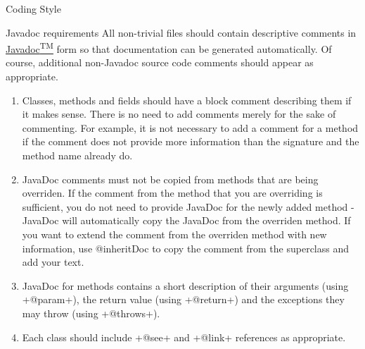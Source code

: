 \begin{section}{Coding Style}
\begin{subsection}{Javadoc requirements}
All non-trivial files should contain descriptive comments in \href{http://www.oracle.com/technetwork/java/javase/documentation/index-jsp-135444.html}{Javadoc\textsuperscript{TM}} form so that documentation can be generated automatically. Of course, additional non-Javadoc source code comments should appear as appropriate.
\begin{enumerate}
  \item Classes, methods and fields should have a block comment describing them if it makes sense. There is no need to add comments merely for the sake of commenting. For example, it is not necessary to add a comment for a method if the comment does not provide more information than the signature and the method name already do.
  \item JavaDoc comments must not be copied from methods that are being overriden. If the comment from the method that you are overriding is sufficient, you do not need to provide JavaDoc for the newly added method - JavaDoc will automatically copy the JavaDoc from the overriden method. If you want to extend the comment from the overriden method with new information, use {@inheritDoc} to copy the comment from the superclass and add your text.
  \item JavaDoc for methods contains a short description of their arguments (using \spverb+@param+), the return value (using \spverb+@return+) and the exceptions they may throw (using \spverb+@throws+).
  \item Each class should include \spverb+@see+ and \spverb+@link+ references as appropriate.
\end{enumerate}
\end{subsection}

\end{section}
